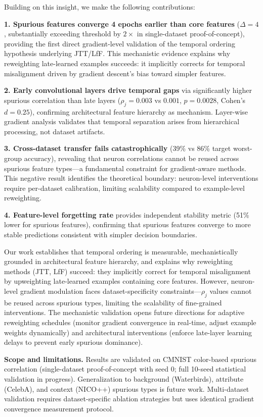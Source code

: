 Building on this insight, we make the following contributions:

\textbf{1. Spurious features converge 4 epochs earlier than core features} ($\Delta=4$, substantially exceeding threshold by $2\times$ in single-dataset proof-of-concept), providing the first direct gradient-level validation of the temporal ordering hypothesis underlying JTT/LfF. This mechanistic evidence explains why reweighting late-learned examples succeeds: it implicitly corrects for temporal misalignment driven by gradient descent's bias toward simpler features.

\textbf{2. Early convolutional layers drive temporal gaps} via significantly higher spurious correlation than late layers ($\rho_j=0.003$ vs $0.001$, $p=0.0028$, Cohen's $d=0.25$), confirming architectural feature hierarchy as mechanism. Layer-wise gradient analysis validates that temporal separation arises from hierarchical processing, not dataset artifacts.

\textbf{3. Cross-dataset transfer fails catastrophically} (39\% vs 86\% target worst-group accuracy), revealing that neuron correlations cannot be reused across spurious feature types---a fundamental constraint for gradient-aware methods. This negative result identifies the theoretical boundary: neuron-level interventions require per-dataset calibration, limiting scalability compared to example-level reweighting.

\textbf{4. Feature-level forgetting rate} provides independent stability metric (51\% lower for spurious features), confirming that spurious features converge to more stable predictions consistent with simpler decision boundaries.

Our work establishes that temporal ordering is measurable, mechanistically grounded in architectural feature hierarchy, and explains why reweighting methods (JTT, LfF) succeed: they implicitly correct for temporal misalignment by upweighting late-learned examples containing core features. However, neuron-level gradient modulation faces dataset-specificity constraints---$\rho_j$ values cannot be reused across spurious types, limiting the scalability of fine-grained interventions. The mechanistic validation opens future directions for adaptive reweighting schedules (monitor gradient convergence in real-time, adjust example weights dynamically) and architectural interventions (enforce late-layer learning delays to prevent early spurious dominance).

\textbf{Scope and limitations.} Results are validated on CMNIST color-based spurious correlation (single-dataset proof-of-concept with seed 0; full 10-seed statistical validation in progress). Generalization to background (Waterbirds), attribute (CelebA), and context (NICO++) spurious types is future work. Multi-dataset validation requires dataset-specific ablation strategies but uses identical gradient convergence measurement protocol.

